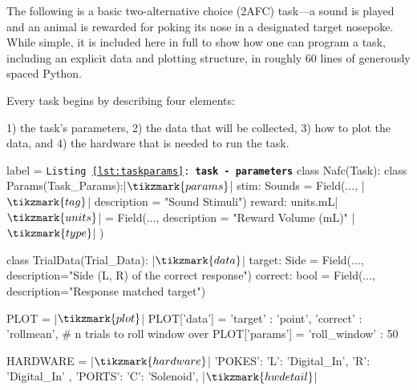 The following is a basic two-alternative choice (2AFC) task---a sound is played and an animal is rewarded for poking its nose in a designated target nosepoke. While simple, it is included here in full to show how one can program a task, including an explicit data and plotting structure, in roughly 60 lines of generously spaced Python.
\clearpage

Every task begins by describing four elements: 

1) the task's parameters, 2) the data that will be collected, 3) how to plot the data, and 4) the hardware that is needed to run the task.

\begin{listing}[h!]
\begin{pythoncode*}{label = \texttt{Listing \ref{lst:taskparams}: \textbf{task - parameters}}}
class Nafc(Task):
    class Params(Task_Params):|$\tikzmark{params}$|
        stim: Sounds = Field(...,          |$\tikzmark{tag}$|
            description = "Sound Stimuli") 
        reward: units.mL|$\tikzmark{units}$| = Field(...,
            description = "Reward Volume (mL)" |$\tikzmark{type}$|
        )

    class TrialData(Trial_Data): |$\tikzmark{data}$|
        target: Side = Field(..., 
            description="Side (L, R) of the correct response")
        correct: bool = Field(...,
            description="Response matched target")

    PLOT = {} |$\tikzmark{plot}$|
    PLOT['data']  =  {'target'  : 'point',
                      'correct' : 'rollmean'},
    # n trials to roll window over
    PLOT['params'] = {'roll_window' : 50}

    HARDWARE = { |$\tikzmark{hardware}$|
        'POKES':{
            'L': 'Digital_In',
            'R': 'Digital_In'
        },
        'PORTS':{
            'C': 'Solenoid', |$\tikzmark{hwdetail}$|
        }
    }
\end{pythoncode*}
\captionlistentry{}%
\label{lst:taskparams}%
\end{listing}%
%
